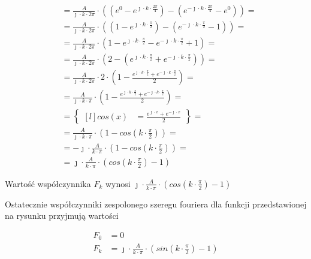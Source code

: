 \begin{task}
\begin{align*}
&=\frac{A}{\jmath \cdot k \cdot 2\pi} \cdot \left(\left( e^{ 0 } - e^{ \jmath \cdot k \cdot \frac{2\pi}{4} } \right)
- \left( e^{ -\jmath \cdot k \cdot \frac{2\pi}{4} } - e^{ 0 }\right) \right)=\\
&=\frac{A}{\jmath \cdot k \cdot 2\pi} \cdot \left(\left( 1 - e^{ \jmath \cdot k \cdot \frac{\pi}{2} } \right)
- \left( e^{-\jmath \cdot k \cdot \frac{\pi}{2} } - 1\right) \right)=\\
&=\frac{A}{\jmath \cdot k \cdot 2\pi} \cdot \left(1 - e^{ \jmath \cdot k \cdot \frac{\pi}{2} } - e^{-\jmath \cdot k \cdot \frac{\pi}{2} } + 1 \right)=\\
&=\frac{A}{\jmath \cdot k \cdot 2\pi} \cdot \left(2 - \left(e^{ \jmath \cdot k \cdot \frac{\pi}{2} } + e^{-\jmath \cdot k \cdot \frac{\pi}{2} } \right) \right)=\\
&=\frac{A}{\jmath \cdot k \cdot 2\pi} \cdot 2 \cdot \left(1 - \frac{e^{ \jmath \cdot k \cdot \frac{\pi}{2} } + e^{-\jmath \cdot k \cdot \frac{\pi}{2} } }{2} \right)=\\
&=\frac{A}{\jmath \cdot k \cdot \pi} \cdot \left(1 - \frac{e^{ \jmath \cdot k \cdot \frac{\pi}{2} } + e^{-\jmath \cdot k \cdot \frac{\pi}{2} } }{2} \right)=\\
&=\begin{Bmatrix*}[l]
cos(x)&=\frac{e^{\jmath \cdot x}+e^{-\jmath \cdot x}}{2}
\end{Bmatrix*}=\\
&=\frac{A}{\jmath \cdot k \cdot \pi} \cdot \left(1 - cos\left( k \cdot \frac{\pi}{2} \right) \right)=\\
&=-\jmath \cdot \frac{A}{k \cdot \pi} \cdot \left(1 - cos\left( k \cdot \frac{\pi}{2} \right) \right)=\\
&=\jmath \cdot \frac{A}{k \cdot \pi} \cdot \left(cos\left( k \cdot \frac{\pi}{2} \right) - 1\right)
\end{align*}

Wartość współczynnika $F_k$ wynosi $\jmath \cdot \frac{A}{k \cdot \pi} \cdot \left(cos\left( k \cdot \frac{\pi}{2} \right) - 1\right)$

Ostatecznie współczynniki zespolonego szeregu fouriera dla funkcji przedstawionej na rysunku przyjmują wartości

\begin{equation}
\begin{aligned}
F_0&=0\\
F_k&=\jmath \cdot \frac{A}{k \cdot \pi} \cdot \left(sin\left( k \cdot \frac{\pi}{2} \right) - 1\right)\\
\end{aligned}
\end{equation}


\end{task}
